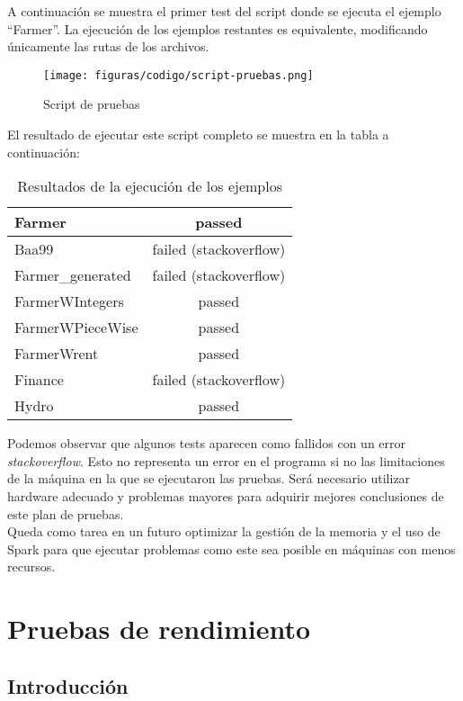 A continuación se muestra el primer test del script donde se ejecuta el ejemplo ``Farmer''. La ejecución de los ejemplos restantes es equivalente, modificando únicamente las rutas de los archivos.\\

\begin{figure}[H]
    \centerline{\texttt{[image: figuras/codigo/script-pruebas.png]}}
    \caption{Script de pruebas}
\end{figure}

El resultado de ejecutar este script completo se muestra en la tabla a continuación: \\

\begin{table} [H]
    \begin{tabularx}{\linewidth}{|X|c|}
        \hline
        Farmer & passed \tabularnewline
        \hline
        Baa99 & failed (stackoverflow) \tabularnewline
        \hline
        Farmer\_generated & failed (stackoverflow) \tabularnewline
        \hline
        FarmerWIntegers & passed \tabularnewline
        \hline
        FarmerWPieceWise & passed \tabularnewline
        \hline
        FarmerWrent & passed \tabularnewline
        \hline
        Finance & failed (stackoverflow) \tabularnewline
        \hline
        Hydro & passed \tabularnewline
        \hline
    \end{tabularx}
    \caption{Resultados de la ejecución de los ejemplos}
    \label{tab:test-examples}
\end{table}

Podemos observar que algunos tests aparecen como fallidos con un error \textit{stackoverflow}. Esto no representa un error en el programa si no las limitaciones de la máquina en la que se ejecutaron las pruebas. 
Será necesario utilizar hardware adecuado y problemas mayores para adquirir mejores conclusiones de este plan de pruebas.\\

Queda como tarea en un futuro optimizar la gestión de la memoria y el uso de Spark para que ejecutar problemas como este sea posible en máquinas con menos recursos. 

\section{Pruebas de rendimiento}

\subsection{Introducción}

